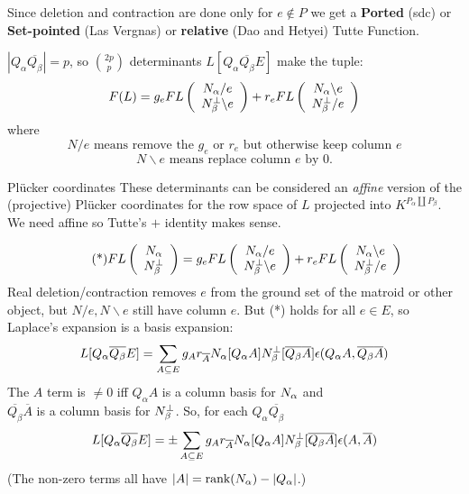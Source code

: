 \documentclass{beamer}
\newcommand{\dunion}{\coprod}
\begin{document}
\begin{frame}
  \begin{block}{Since deletion and contraction are done only for $e\not\in P$}
    we get a \textbf{Ported} (sdc) or \textbf{Set-pointed} (Las Vergnas) or
    \textbf{relative} (Dao and Hetyei) Tutte Function.
  \end{block}

  
  $|Q_\alpha\overline{Q_\beta}|=p$, so $\binom{2p}{p}$ determinants $L[Q_\alpha \overline{Q_\beta} E]$ make the tuple:
  \[
  F(L) =
  g_eFL\left(\begin{array}{c} N_{\alpha}/e\\ N_{\beta}^{\perp}\backslash e \end{array} \right)
+
r_eFL\left(\begin{array}{c} N_{\alpha}\backslash e\\ N_{\beta}^{\perp}/e \end{array} \right)
\]
where
\[
N/e \text{\ means remove the\ } g_e \text{\ or\ } r_e \text{\ but otherwise keep column\ }e
\]
\[
N\backslash e \text{\ means replace column\ }e\text{\ by\ }0.
\]
\begin{block}{Pl\"{u}cker coordinates}
  These determinants can be considered an \emph{affine} version of the
  (projective) Pl\"{u}cker coordinates for the row space of $L$ projected
  into $K^{P_\alpha\dunion P_\beta}$.  We need affine so Tutte's $\mathbf{+}$ identity makes sense.
\end{block}
\end{frame}

\begin{frame}
    \begin{equation*}\tag{*}
  FL\left( \begin{array}{c} N_{\alpha}\\ N_{\beta}^{\perp} \end{array} \right) =
  g_eFL\left(\begin{array}{c} N_{\alpha}/e\\ N_{\beta}^{\perp}\backslash e \end{array} \right)
+
r_eFL\left(\begin{array}{c} N_{\alpha}\backslash e\\ N_{\beta}^{\perp}/e \end{array} \right)
    \end{equation*}
Real deletion/contraction removes $e$ from the ground set of the matroid or other
object, but $N/e,N\backslash e$ still have column $e$.  But (*) holds for all $e\in E$, so
Laplace's expansion is
a basis expansion:
\[
L[Q_\alpha \overline{Q_\beta} E] = \sum_{A\subseteq E}g_Ar_{\overline{A}}N_{\alpha}[Q_\alpha A]N_{\beta}^{\perp}[\overline{Q_\beta}\overline{A}]
\epsilon(Q_\alpha A,\overline{Q_\beta}\overline{A})
\]
The $A$ term is $\neq 0$ iff $Q_\alpha A$ is a column basis for $N_{\alpha}$ and \\
$\overline{Q_\beta} \overline{A}$ is a column basis for $N_{\beta}^{\perp}$.
So, for each $Q_\alpha \overline{Q_\beta} $
\[
L[Q_\alpha \overline{Q_\beta} E] =
\pm\sum_{A\subseteq E}g_Ar_{\overline{A}}N_{\alpha}[Q_\alpha A]N_{\beta}^{\perp}[\overline{Q_\beta}\overline{A}]
\epsilon(A,\overline{A})
\]
(The non-zero terms all have $|A|=\text{rank}(N_{\alpha})-|Q_\alpha|$.)
\end{frame}
\end{document}
